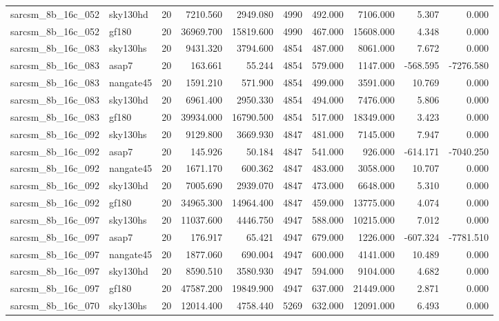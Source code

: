 \begin{longtable}{llrrrrrrrr}
sarcsm\_8b\_16c\_052 & sky130hd & 20 & 7210.560 & 2949.080 & 4990 & 492.000 & 7106.000 & 5.307 & 0.000 \\
sarcsm\_8b\_16c\_052 & gf180 & 20 & 36969.700 & 15819.600 & 4990 & 467.000 & 15608.000 & 4.348 & 0.000 \\
sarcsm\_8b\_16c\_083 & sky130hs & 20 & 9431.320 & 3794.600 & 4854 & 487.000 & 8061.000 & 7.672 & 0.000 \\
sarcsm\_8b\_16c\_083 & asap7 & 20 & 163.661 & 55.244 & 4854 & 579.000 & 1147.000 & -568.595 & -7276.580 \\
sarcsm\_8b\_16c\_083 & nangate45 & 20 & 1591.210 & 571.900 & 4854 & 499.000 & 3591.000 & 10.769 & 0.000 \\
sarcsm\_8b\_16c\_083 & sky130hd & 20 & 6961.400 & 2950.330 & 4854 & 494.000 & 7476.000 & 5.806 & 0.000 \\
sarcsm\_8b\_16c\_083 & gf180 & 20 & 39934.000 & 16790.500 & 4854 & 517.000 & 18349.000 & 3.423 & 0.000 \\
sarcsm\_8b\_16c\_092 & sky130hs & 20 & 9129.800 & 3669.930 & 4847 & 481.000 & 7145.000 & 7.947 & 0.000 \\
sarcsm\_8b\_16c\_092 & asap7 & 20 & 145.926 & 50.184 & 4847 & 541.000 & 926.000 & -614.171 & -7040.250 \\
sarcsm\_8b\_16c\_092 & nangate45 & 20 & 1671.170 & 600.362 & 4847 & 483.000 & 3058.000 & 10.707 & 0.000 \\
sarcsm\_8b\_16c\_092 & sky130hd & 20 & 7005.690 & 2939.070 & 4847 & 473.000 & 6648.000 & 5.310 & 0.000 \\
sarcsm\_8b\_16c\_092 & gf180 & 20 & 34965.300 & 14964.400 & 4847 & 459.000 & 13775.000 & 4.074 & 0.000 \\
sarcsm\_8b\_16c\_097 & sky130hs & 20 & 11037.600 & 4446.750 & 4947 & 588.000 & 10215.000 & 7.012 & 0.000 \\
sarcsm\_8b\_16c\_097 & asap7 & 20 & 176.917 & 65.421 & 4947 & 679.000 & 1226.000 & -607.324 & -7781.510 \\
sarcsm\_8b\_16c\_097 & nangate45 & 20 & 1877.060 & 690.004 & 4947 & 600.000 & 4141.000 & 10.489 & 0.000 \\
sarcsm\_8b\_16c\_097 & sky130hd & 20 & 8590.510 & 3580.930 & 4947 & 594.000 & 9104.000 & 4.682 & 0.000 \\
sarcsm\_8b\_16c\_097 & gf180 & 20 & 47587.200 & 19849.900 & 4947 & 637.000 & 21449.000 & 2.871 & 0.000 \\
sarcsm\_8b\_16c\_070 & sky130hs & 20 & 12014.400 & 4758.440 & 5269 & 632.000 & 12091.000 & 6.493 & 0.000 \\

\end{longtable}
